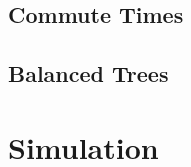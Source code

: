 \documentclass[12pt]{article}
\theoremstyle{definition}
\begin{document}
\subsection{Commute Times}
\subsection{Balanced Trees}

\section{Simulation}

\cite{AF14}

\cite{Bo98}
\cite{DS84}
\cite{Du11}
\cite{Gr10}
\cite{LP17}

\newpage
{}

\begin{comment}
\begin{thebibliography}{9}

\bibitem{AF14}
	Aldous, D. and J. Fill.
	2014.
	\textit{Reversible Markov Chains and Random Walks on Graphs}.

\bibitem{BH94}
	Blom, G., L. Holst and D. Sandell.
	\textit{Problems and Snapshots from the World of Probability},
	Springer Science \& Business Media, 1994.

\bibitem{Bo13}
	Bollobás, B.
	2013.
	\textit{Modern Graph Theory},
	Vol. 184,
	Springer Science \& Business Media.

\bibitem{DS84}
	Doyle, P. G. and J. L. Snell.
	1984.
	\textit{Random Walks and Electric Networks},
	Mathematical Association of America.
 
\bibitem{Gr10}
	Grimmett, G.
	2010.
	\textit{Probability on Graphs : Random Processes on Graphs and Lattices},
	Vol. 8,
	Cambridge University Press.

\bibitem{LP08}
	Levin, D. A. and Y. Peres.
	2017.
	\textit{Markov Chains and Mixing Times},
	Vol. 107,
	American Mathematical Society.

\end{thebibliography}
\end{comment}
\end{document}
